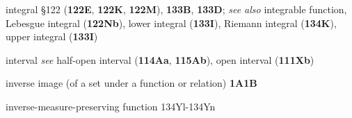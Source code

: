 integral \S122 ({\bf 122E}, {\bf 122K}, {\bf 122M}), {\bf 133B}, {\bf
133D}; 
  {\it see also}
integrable function, Lebesgue integral ({\bf 122Nb}),
lower integral ({\bf 133I}), Riemann integral ({\bf 134K}), upper integral ({\bf 133I})


























interval
  {\it see}
half-open interval ({\bf 114Aa}, {\bf 115Ab}),
open interval ({\bf 111Xb})





















 





inverse image (of a set under a function or relation) {\bf 1A1B}


inverse-measure-preserving function
134Yl-134Yn
















































